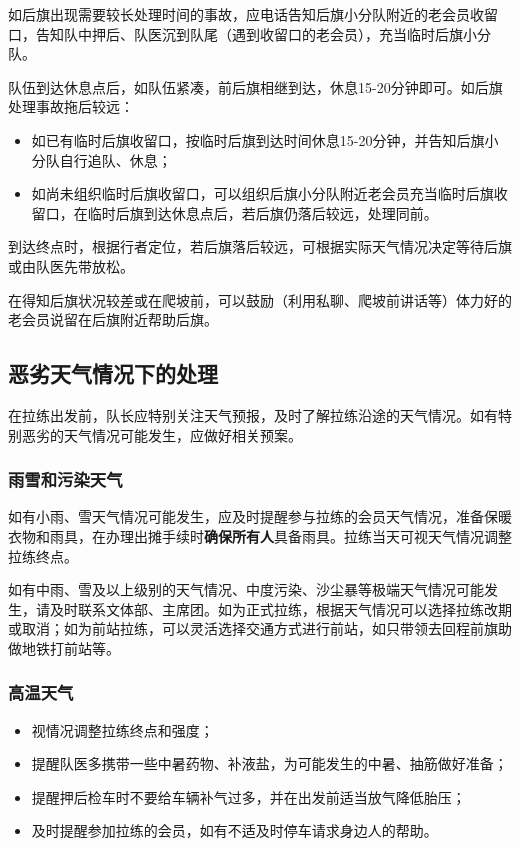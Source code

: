 \documentclass[UTF8]{ctexart}
\begin{document}
如后旗出现需要较长处理时间的事故，应电话告知后旗小分队附近的老会员收留口，告知队中押后、队医沉到队尾（遇到收留口的老会员），充当临时后旗小分队。

队伍到达休息点后，如队伍紧凑，前后旗相继到达，休息15-20分钟即可。如后旗处理事故拖后较远：
\begin{itemize}[nosep,left=2em]
    \item 如已有临时后旗收留口，按临时后旗到达时间休息15-20分钟，并告知后旗小分队自行追队、休息；
    \item 如尚未组织临时后旗收留口，可以组织后旗小分队附近老会员充当临时后旗收留口，在临时后旗到达休息点后，若后旗仍落后较远，处理同前。
\end{itemize}

到达终点时，根据行者定位，若后旗落后较远，可根据实际天气情况决定等待后旗或由队医先带放松。

在得知后旗状况较差或在爬坡前，可以鼓励（利用私聊、爬坡前讲话等）体力好的老会员说留在后旗附近帮助后旗。

\subsection{恶劣天气情况下的处理}

在拉练出发前，队长应特别关注天气预报，及时了解拉练沿途的天气情况。如有特别恶劣的天气情况可能发生，应做好相关预案。

\subsubsection{雨雪和污染天气}

如有小雨、雪天气情况可能发生，应及时提醒参与拉练的会员天气情况，准备保暖衣物和雨具，在办理出摊手续时\textbf{确保所有人}具备雨具。拉练当天可视天气情况调整拉练终点。

如有中雨、雪及以上级别的天气情况、中度污染、沙尘暴等极端天气情况可能发生，请及时联系文体部、主席团。如为正式拉练，根据天气情况可以选择拉练改期或取消；如为前站拉练，可以灵活选择交通方式进行前站，如只带领去回程前旗助做地铁打前站等。

\subsubsection{高温天气}

\begin{itemize}[nosep,left=2em]
    \item 视情况调整拉练终点和强度；
    \item 提醒队医多携带一些中暑药物、补液盐，为可能发生的中暑、抽筋做好准备；
    \item 提醒押后检车时不要给车辆补气过多，并在出发前适当放气降低胎压；
    \item 及时提醒参加拉练的会员，如有不适及时停车请求身边人的帮助。
\end{itemize}
\end{document}
